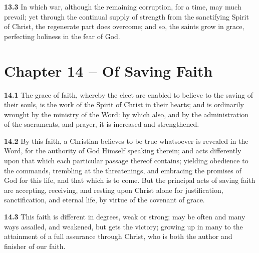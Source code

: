 \par\textbf{13.3} In which war, although the remaining corruption, for a time, may much prevail; yet through the continual supply of strength from the sanctifying Spirit of Christ, the regenerate part does overcome; and so, the saints grow in grace, perfecting holiness in the fear of God.  

\section{Chapter 14 -- Of Saving Faith}

\par\textbf{14.1} The grace of faith, whereby the elect are enabled to believe to the saving of their souls, is the work of the Spirit of Christ in their hearts; and is ordinarily wrought by the ministry of the Word: by which also, and by the administration of the sacraments, and prayer, it is increased and strengthened.   

\par\textbf{14.2} By this faith, a Christian believes to be true whatsoever is revealed in the Word, for the authority of God Himself speaking therein; and acts differently upon that which each particular passage thereof contains; yielding obedience to the commands, trembling at the threatenings, and embracing the promises of God for this life, and that which is to come. But the principal acts of saving faith are accepting, receiving, and resting upon Christ alone for justification, sanctification, and eternal life, by virtue of the covenant of grace.   

\par\textbf{14.3} This faith is different in degrees, weak or strong; may be often and many ways assailed, and weakened, but gets the victory; growing up in many to the attainment of a full assurance through Christ, who is both the author and finisher of our faith.  

